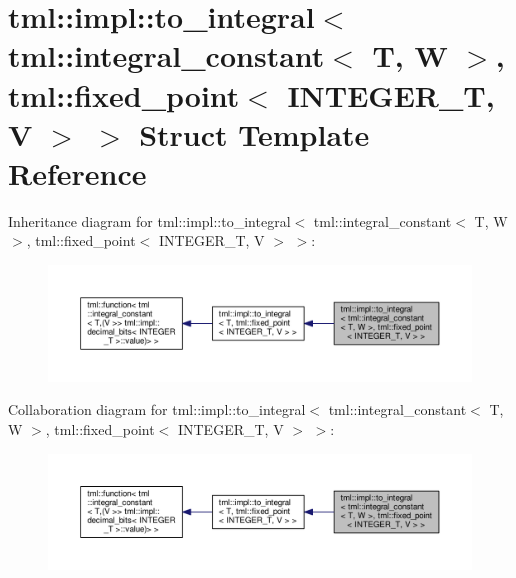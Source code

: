 \hypertarget{structtml_1_1impl_1_1to__integral_3_01tml_1_1integral__constant_3_01_t_00_01_w_01_4_00_01tml_1_1910925ffdd16f63859ad36c42576b8b2}{\section{tml\+:\+:impl\+:\+:to\+\_\+integral$<$ tml\+:\+:integral\+\_\+constant$<$ T, W $>$, tml\+:\+:fixed\+\_\+point$<$ I\+N\+T\+E\+G\+E\+R\+\_\+\+T, V $>$ $>$ Struct Template Reference}
\label{structtml_1_1impl_1_1to__integral_3_01tml_1_1integral__constant_3_01_t_00_01_w_01_4_00_01tml_1_1910925ffdd16f63859ad36c42576b8b2}
}


Inheritance diagram for tml\+:\+:impl\+:\+:to\+\_\+integral$<$ tml\+:\+:integral\+\_\+constant$<$ T, W $>$, tml\+:\+:fixed\+\_\+point$<$ I\+N\+T\+E\+G\+E\+R\+\_\+\+T, V $>$ $>$\+:
\nopagebreak
\begin{figure}[H]
\begin{center}
\leavevmode
\includegraphics[width=350pt]{structtml_1_1impl_1_1to__integral_3_01tml_1_1integral__constant_3_01_t_00_01_w_01_4_00_01tml_1_1161c8b38d43f1dbf98147613a0c554e7}
\end{center}
\end{figure}


Collaboration diagram for tml\+:\+:impl\+:\+:to\+\_\+integral$<$ tml\+:\+:integral\+\_\+constant$<$ T, W $>$, tml\+:\+:fixed\+\_\+point$<$ I\+N\+T\+E\+G\+E\+R\+\_\+\+T, V $>$ $>$\+:
\nopagebreak
\begin{figure}[H]
\begin{center}
\leavevmode
\includegraphics[width=350pt]{structtml_1_1impl_1_1to__integral_3_01tml_1_1integral__constant_3_01_t_00_01_w_01_4_00_01tml_1_171e9f84db3351b16412f30d8afbc228b}
\end{center}
\end{figure}
